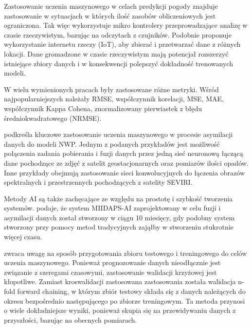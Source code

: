 Zastosowanie uczenia maszynowego w celach predykcji pogody znajduje zastosowanie
w sytuacjach w których ilość zasobów obliczeniowych jest ograniczona. Tak więc
\cite{weather-forecasting-using-ml} wykorzystuje
mikro kontrolery przeprowadzające analizę w czasie rzeczywistym, bazując na odczytach z 
czujników. Podobnie \cite{smart-weather-forecasting}
proponuje wykorzystanie internetu rzeczy (IoT), aby zbierać i przetwarzać dane z różnych lokacji.
Dane gromadzone w czasie rzeczywistym mają potencjał rozszerzyć istniejące zbiory danych
i w konsekwencji polepszyć dokładność trenowanych modeli.

W wielu wymienionych pracach \cite{development-and-application-of-ml-in}
były zastosowane różne metryki. Wśród najpopularniejszych
należały RMSE, współczynnik korelacji, MSE, MAE, współczynnik Kappa Cohena,
znormalizowany pierwiastek z błędu średniokwadratowego (NRMSE).

\cite{ai-revolutionises-weather-prediction}
podkreśla kluczowe zastosowanie uczenia maszynowego w procesie asymilacji danych do modeli NWP.
Jednym z podanych przykładów jest możliwość połączenia zadania pobierania i fuzji danych 
przez jedną sieć neuronową łączącą dane pochodzące ze zdjęć z satelit geostacjonarnych oraz 
pomiarów ilości opadów. Inne przykłady obejmują zastosowanie sieci konwolucyjnych do łączenia
obrazów spektralnych i przestrzennych pochodzących z satelity SEVIRI. 

Metody AI są także zachęcające ze względu na prostotę i szybkość tworzenia systemów.
\cite{ai-revolutionises-weather-prediction}
podaje, że system MIIDAPS-AI zaprojektowany w celu fuzji i asymilacji danych został stworzony w ciągu 10 miesięcy, 
gdy podobny system stworzony przy pomocy metod tradycyjnych zająłby
w stworzeniu stukrotnie więcej czasu.

\cite{ml-applied-to-weather-forecasting}
zwraca uwagę na sposób przygotowania zbioru testowego i treningowego do celów uczenia 
maszynowego. Ponieważ prognozowanie danych nieodłącznie jest związanie z szeregami czasowymi,
zastosowanie walidacji krzyżowej jest kłopotliwe. Zamiast kroswalidacji zastosowana 
zastosowania została walidacja n-fold forward chaining, w którym zbiór testowy składa się 
z danych należących do okresu bezpośrednio następującego po zbiorze treningowym. Ta metoda
przynosi o wiele dokładniejsze wyniki, ponieważ skupia się na przewidywaniu danych 
z przyszłości, bazując na obecnych pomiarach.

